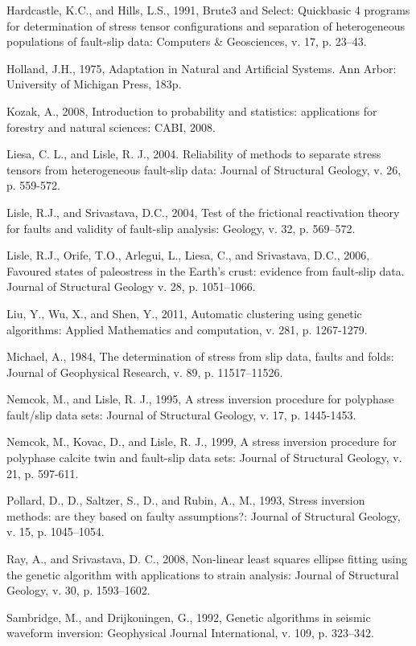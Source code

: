 {\begin{hangparas}{.25in}{1}
    Hardcastle, K.C., and Hills, L.S., 1991, Brute3 and Select: Quickbasic 4 programs for determination of stress tensor configurations and separation of heterogeneous populations of fault-slip data: Computers \& Geosciences, v. 17, p. 23–43.

    Holland, J.H., 1975, Adaptation in Natural and Artificial Systems. Ann Arbor: University of Michigan Press, 183p.
    
    Kozak, A., 2008, Introduction to probability and statistics: applications for forestry and natural sciences: CABI, 2008.
    
    Liesa, C. L., and Lisle, R. J., 2004. Reliability of methods to separate stress tensors from heterogeneous fault-slip data: Journal of Structural Geology, v. 26, p. 559-572. 

    Lisle, R.J., and Srivastava, D.C., 2004, Test of the frictional reactivation theory for faults and validity of fault-slip analysis: Geology, v. 32, p. 569–572.
    
    Lisle, R.J., Orife, T.O., Arlegui, L., Liesa, C., and Srivastava, D.C., 2006, Favoured states of paleostress in the Earth’s crust: evidence from fault-slip data. Journal of Structural Geology v. 28, p. 1051–1066.
    
    Liu, Y., Wu, X., and Shen, Y., 2011, Automatic clustering using genetic algorithms: Applied Mathematics and computation, v. 281, p. 1267-1279.

    Michael, A., 1984, The determination of stress from slip data, faults and folds: Journal of Geophysical Research, v. 89, p. 11517–11526.
    
    Nemcok, M., and Lisle, R. J., 1995, A stress inversion procedure for polyphase fault/slip data sets: Journal of Structural Geology, v. 17, p. 1445-1453. 

    Nemcok, M., Kovac, D., and Lisle, R. J., 1999, A stress inversion procedure for polyphase calcite twin and fault-slip data sets: Journal of Structural Geology, v. 21, p. 597-611.
    
    Pollard, D., D., Saltzer, S., D., and Rubin, A., M., 1993, Stress inversion methods: are they based on faulty assumptions?: Journal of Structural Geology, v. 15, p. 1045–1054.
    
    Ray, A., and Srivastava, D. C., 2008, Non-linear least squares ellipse fitting using the genetic algorithm with applications to strain analysis: Journal of Structural Geology, v. 30, p. 1593–1602.

    Sambridge, M., and Drijkoningen, G., 1992, Genetic algorithms in seismic waveform inversion: Geophysical Journal International, v. 109, p. 323–342.


\end{hangparas}}
